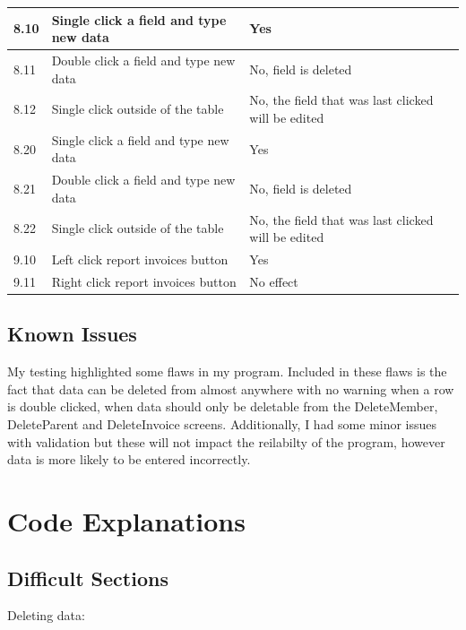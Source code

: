 \begin{center}
\begin{longtable}{|p{2cm}|p{5cm}|p{8cm}|}
       \rowcolor{lightgrey} 8.10 & Single click a field and type new data & Yes \\ \hline
       \rowcolor{lightgrey} 8.11 & Double click a field and type new data & No, field is deleted \\ \hline
       \rowcolor{lightgrey} 8.12 & Single click outside of the table & No, the field that was last clicked will be edited \\ \hline
        
       \rowcolor{lightgrey} 8.20 & Single click a field and type new data & Yes \\ \hline
       \rowcolor{lightgrey} 8.21 & Double click a field and type new data &No, field is deleted \\ \hline
       \rowcolor{lightgrey} 8.22 & Single click outside of the table & No, the field that was last clicked will be edited \\ \hline

       \rowcolor{lightgrey} 9.10 & Left click report invoices button & Yes \\ \hline
       \rowcolor{lightgrey} 9.11 & Right click report invoices button & No effect \\ \hline
    \end{longtable}
\end{center}


\subsection{Known Issues}
My testing highlighted some flaws in my program. Included in these flaws is the fact that data can be deleted from almost anywhere with no warning when a row is double clicked, when data should only be deletable from the DeleteMember, DeleteParent and DeleteInvoice screens. Additionally, I had some minor issues with validation but these will not impact the reilabilty of the program, however data is more likely to be entered incorrectly.

\section{Code Explanations}

\subsection{Difficult Sections}

Deleting data:

